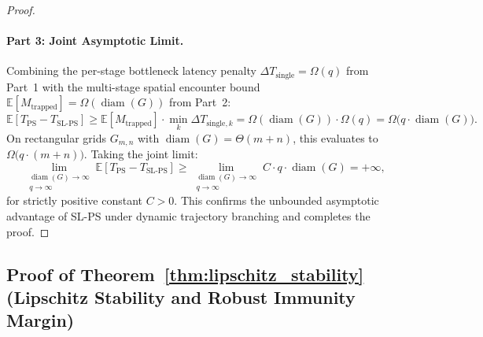 \documentclass[11pt,a4paper]{article}
\begin{document}
\begin{proof}
\paragraph{Part 3: Joint Asymptotic Limit.}
Combining the per-stage bottleneck latency penalty $\Delta T_{\text{single}} = \Omega(q)$ from Part~1 with the multi-stage spatial encounter bound $\mathbb{E}[M_{\text{trapped}}] = \Omega(\operatorname{diam}(G))$ from Part~2:
\begin{equation}
\mathbb{E}\left[ T_{\text{PS}} - T_{\text{SL-PS}} \right] \ge \mathbb{E}[M_{\text{trapped}}] \cdot \min_k \Delta T_{\text{single}, k} = \Omega(\operatorname{diam}(G)) \cdot \Omega(q) = \Omega\big(q \cdot \operatorname{diam}(G)\big).
\end{equation}
On rectangular grids $G_{m,n}$ with $\operatorname{diam}(G) = \Theta(m + n)$, this evaluates to $\Omega\big(q \cdot (m + n)\big)$. Taking the joint limit:
\begin{equation}
\lim_{\substack{\operatorname{diam}(G) \to \infty \\ q \to \infty}} \mathbb{E}\left[ T_{\text{PS}} - T_{\text{SL-PS}} \right] \ge \lim_{\substack{\operatorname{diam}(G) \to \infty \\ q \to \infty}} C \cdot q \cdot \operatorname{diam}(G) = +\infty,
\end{equation}
for strictly positive constant $C > 0$. This confirms the unbounded asymptotic advantage of SL-PS under dynamic trajectory branching and completes the proof.
\end{proof}

\subsection{Proof of Theorem~\ref{thm:lipschitz_stability} (Lipschitz Stability and Robust Immunity Margin)}
\label{subsec:proof_thm5}
\end{document}
